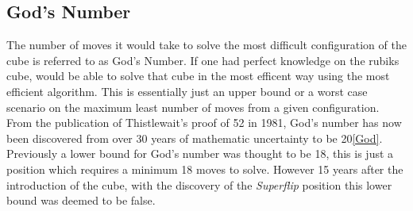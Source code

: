 \documentclass{article}
\begin{document}
\subsection{God's Number}
The number of moves it would take to solve the most difficult configuration of the cube is referred to as God's Number. If one had perfect knowledge on the rubiks cube, would be able to solve that cube in the most efficent way using the most efficient algorithm. This is essentially just an upper bound or a worst case scenario on the maximum least number of moves from a given configuration. From the publication of Thistlewait's proof of 52 in 1981, God's number has now been discovered from over 30 years of mathematic uncertainty to be 20\ref{God}. \newline Previously a lower bound for God's number was thought to be 18, this is just a position which requires a minimum 18 moves to solve. However 15 years after the introduction of the cube, with the discovery of the \textit{Superflip} position this lower bound was deemed to be false.
\pagebreak
\end{document}
